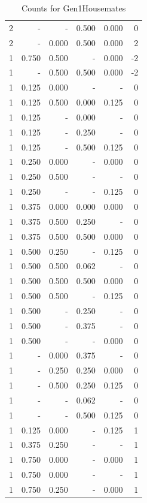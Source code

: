 \documentclass[a4paper]{article}\usepackage[]{graphicx}\usepackage[]{color}
\begin{document}
\begin{table}[ht]
\begin{tabular}{rrrrrr}
   \rowcolor{sosoColor} 2 & - & - & 0.500 & 0.000 & 0 \\ 
   \rowcolor{badColor} 2 & - & 0.000 & 0.500 & 0.000 & 2 \\ 
  1 & 0.750 & 0.500 & - & 0.000 & -2 \\ 
   \rowcolor{goodColor} 1 & - & 0.500 & 0.500 & 0.000 & -2 \\ 
  1 & 0.125 & 0.000 & - & - & 0 \\ 
   \rowcolor{badColor} 1 & 0.125 & 0.500 & 0.000 & 0.125 & 0 \\ 
   \rowcolor{sosoColor} 1 & 0.125 & - & 0.000 & - & 0 \\ 
   \rowcolor{sosoColor} 1 & 0.125 & - & 0.250 & - & 0 \\ 
   \rowcolor{sosoColor} 1 & 0.125 & - & 0.500 & 0.125 & 0 \\ 
  1 & 0.250 & 0.000 & - & 0.000 & 0 \\ 
  1 & 0.250 & 0.500 & - & - & 0 \\ 
   \rowcolor{nullColor} 1 & 0.250 & - & - & 0.125 & 0 \\ 
   \rowcolor{goodColor} 1 & 0.375 & 0.000 & 0.000 & 0.000 & 0 \\ 
   \rowcolor{badColor} 1 & 0.375 & 0.500 & 0.250 & - & 0 \\ 
   \rowcolor{goodColor} 1 & 0.375 & 0.500 & 0.500 & 0.000 & 0 \\ 
  1 & 0.500 & 0.250 & - & 0.125 & 0 \\ 
   \rowcolor{badColor} 1 & 0.500 & 0.500 & 0.062 & - & 0 \\ 
   \rowcolor{goodColor} 1 & 0.500 & 0.500 & 0.500 & 0.000 & 0 \\ 
  1 & 0.500 & 0.500 & - & 0.125 & 0 \\ 
   \rowcolor{sosoColor} 1 & 0.500 & - & 0.250 & - & 0 \\ 
   \rowcolor{sosoColor} 1 & 0.500 & - & 0.375 & - & 0 \\ 
   \rowcolor{nullColor} 1 & 0.500 & - & - & 0.000 & 0 \\ 
   \rowcolor{badColor} 1 & - & 0.000 & 0.375 & - & 0 \\ 
   \rowcolor{goodColor} 1 & - & 0.250 & 0.250 & 0.000 & 0 \\ 
   \rowcolor{badColor} 1 & - & 0.500 & 0.250 & 0.125 & 0 \\ 
   \rowcolor{sosoColor} 1 & - & - & 0.062 & - & 0 \\ 
   \rowcolor{sosoColor} 1 & - & - & 0.500 & 0.125 & 0 \\ 
  1 & 0.125 & 0.000 & - & 0.125 & 1 \\ 
  1 & 0.375 & 0.250 & - & - & 1 \\ 
  1 & 0.750 & 0.000 & - & 0.000 & 1 \\ 
  1 & 0.750 & 0.000 & - & - & 1 \\ 
  1 & 0.750 & 0.250 & - & 0.000 & 1 \\ 
   \hline
\end{tabular}
\caption{Counts for Gen1Housemates} 
\end{table}
\end{document}
